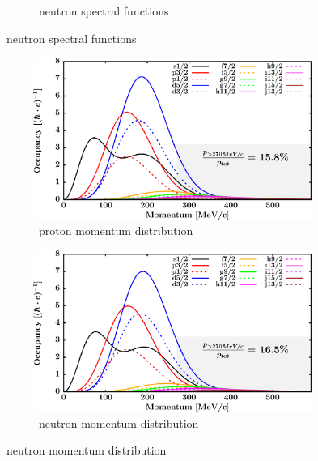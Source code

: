 \begin{figure}[hbtp]
\begin{subfigure}[b]{0.45\textwidth}
        \caption{\caForty\ neutron spectral functions}
        \label{DOMFitData_ca40_neutron_spectralFunctions}
    \end{subfigure}
\end{figure}
\afterpage{\clearpage}
\begin{figure}[hbtp]
    \captionsetup[subfigure]{labelformat=empty}
    \centering
    \begin{subfigure}[b]{0.45\textwidth}
        \centering
        \includegraphics[width=\linewidth]{figures/ca40_protonLJMomentumDistIntegral.png}
        \caption{\caForty\ proton momentum distribution}
        \label{DOMFitData_ca40_proton_momentumDist}
    \end{subfigure}\hspace{6pt}
    \begin{subfigure}[b]{0.45\textwidth}
        \centering
        \includegraphics[width=\linewidth]{figures/ca40_neutronLJMomentumDistIntegral.png}
        \caption{\caForty\ neutron momentum distribution}
        \label{DOMFitData_ca40_neutron_momentumDist}
    \end{subfigure}\vspace{0.3in}

\end{figure}

